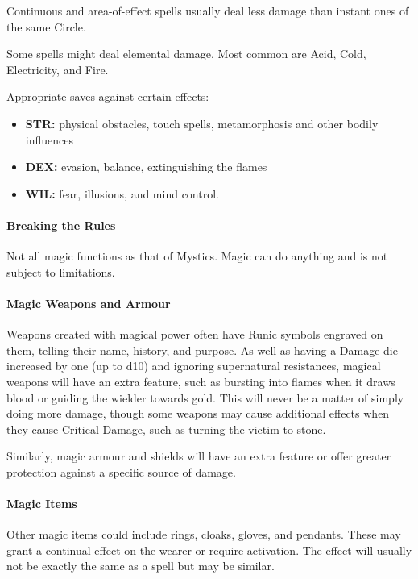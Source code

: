 \documentclass[itdr]{subfiles}
\begin{document}
Continuous and area-of-effect spells usually deal less damage than instant ones of the same Circle.

Some spells might deal elemental damage. Most common are Acid, Cold, Electricity, and Fire.

Appropriate saves against certain effects:
\begin{itemize}
	\item \textbf{STR:} physical obstacles, touch spells, metamorphosis and other bodily influences
	\item \textbf{DEX:} evasion, balance, extinguishing the flames
	\item \textbf{WIL:} fear, illusions, and mind control.
\end{itemize}

\vfill
\break

\paragraph{Breaking the Rules}
Not all magic functions as that of Mystics. Magic can do anything and is not subject to limitations.

\paragraph{Magic Weapons and Armour}
Weapons created with magical power often have Runic symbols engraved on them, telling their name, history, and purpose. As well as having a Damage die increased by one (up to d10) and ignoring supernatural resistances, magical weapons will have an extra feature, such as bursting into flames when it draws blood or guiding the wielder towards gold. This will never be a matter of simply doing more damage, though some weapons may cause additional effects when they cause Critical Damage, such as turning the victim to stone.

Similarly, magic armour and shields will have an extra feature or offer greater protection against a specific source of damage.

\paragraph{Magic Items}
Other magic items could include rings, cloaks, gloves, and pendants. These may grant a continual effect on the wearer or require activation. The effect will usually not be exactly the same as a spell but may be similar.
\end{document}

